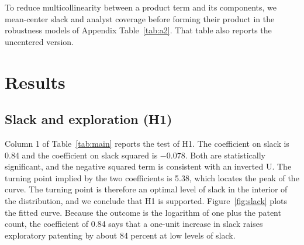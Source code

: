\documentclass[11pt]{article}
\begin{document}
To reduce multicollinearity between a product term and its components, we mean-center slack and analyst coverage before forming their product in the robustness models of Appendix Table~\ref{tab:a2}. That table also reports the uncentered version.

\section{Results}

\subsection{Slack and exploration (H1)}

Column 1 of Table~\ref{tab:main} reports the test of H1. The coefficient on slack is 0.84 and the coefficient on slack squared is $-0.078$. Both are statistically significant, and the negative squared term is consistent with an inverted U. The turning point implied by the two coefficients is 5.38, which locates the peak of the curve. The turning point is therefore an optimal level of slack in the interior of the distribution, and we conclude that H1 is supported. Figure~\ref{fig:slack} plots the fitted curve. Because the outcome is the logarithm of one plus the patent count, the coefficient of 0.84 says that a one-unit increase in slack raises exploratory patenting by about 84 percent at low levels of slack.
\end{document}
